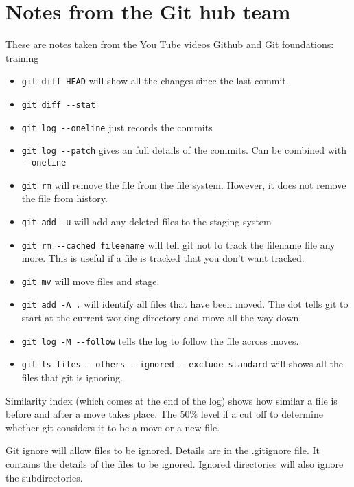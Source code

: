 \documentclass[11pt]{article} %
\begin{document}
\section{Notes from the Git hub team}
These are notes taken from the You Tube videos \href{https://www.youtube.com/watch?v=WxMFZncm12s&index=4&list=PLg7s6cbtAD15G8lNyoaYDuKZSKyJrgwB-}{Github and Git foundations: training}
\begin{itemize}
\item \lstinline{git diff HEAD} will show all the changes since the last commit. 
\item \lstinline{git diff --stat} 
\item \lstinline{git log --oneline} just records the commits
\item \lstinline{git log --patch} gives an full details of the commits. Can be combined with \lstinline{--oneline}
\item \lstinline{git rm} will remove the file from the file system.  However, it does not remove the file from history. 
\item \lstinline{git add -u} will add any deleted files to the staging system
\item \lstinline{git rm --cached fileename} will tell git not to track the filename file any more.  This is useful if a file is tracked that you don't want tracked.  
\item \lstinline{git mv} will move files and stage.
\item  \lstinline{git add -A .} will identify all files that have been moved.  The dot tells git to start at the current working directory and move all the way down.
\item \lstinline{git log -M --follow} tells the log to follow the file across moves. 
\item \lstinline{git ls-files --others --ignored --exclude-standard} will shows all the files that git is ignoring. 
\end{itemize}
Similarity index (which comes at the end of the log) shows how similar a file is before and after a move takes place. The 50\% level if a cut off to determine whether git considers it to be a move or a new file. 

Git ignore will allow files to be ignored.  Details are in the .gitignore file.  It contains the details of the files to be ignored. Ignored directories will also ignore the subdirectories. 
\end{document}
